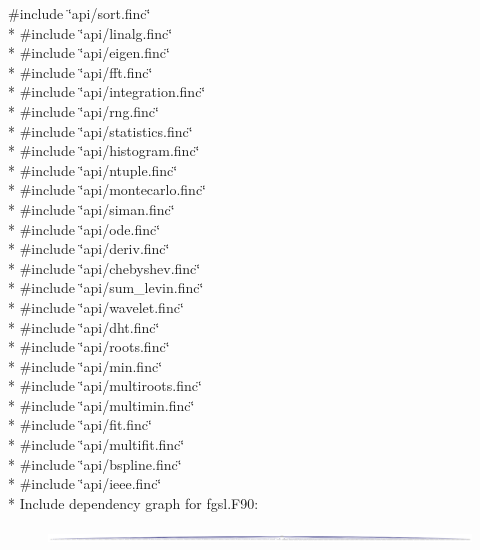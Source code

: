 {\ttfamily \#include \char`\"{}api/sort.\-finc\char`\"{}}\\*
{\ttfamily \#include \char`\"{}api/linalg.\-finc\char`\"{}}\\*
{\ttfamily \#include \char`\"{}api/eigen.\-finc\char`\"{}}\\*
{\ttfamily \#include \char`\"{}api/fft.\-finc\char`\"{}}\\*
{\ttfamily \#include \char`\"{}api/integration.\-finc\char`\"{}}\\*
{\ttfamily \#include \char`\"{}api/rng.\-finc\char`\"{}}\\*
{\ttfamily \#include \char`\"{}api/statistics.\-finc\char`\"{}}\\*
{\ttfamily \#include \char`\"{}api/histogram.\-finc\char`\"{}}\\*
{\ttfamily \#include \char`\"{}api/ntuple.\-finc\char`\"{}}\\*
{\ttfamily \#include \char`\"{}api/montecarlo.\-finc\char`\"{}}\\*
{\ttfamily \#include \char`\"{}api/siman.\-finc\char`\"{}}\\*
{\ttfamily \#include \char`\"{}api/ode.\-finc\char`\"{}}\\*
{\ttfamily \#include \char`\"{}api/deriv.\-finc\char`\"{}}\\*
{\ttfamily \#include \char`\"{}api/chebyshev.\-finc\char`\"{}}\\*
{\ttfamily \#include \char`\"{}api/sum\-\_\-levin.\-finc\char`\"{}}\\*
{\ttfamily \#include \char`\"{}api/wavelet.\-finc\char`\"{}}\\*
{\ttfamily \#include \char`\"{}api/dht.\-finc\char`\"{}}\\*
{\ttfamily \#include \char`\"{}api/roots.\-finc\char`\"{}}\\*
{\ttfamily \#include \char`\"{}api/min.\-finc\char`\"{}}\\*
{\ttfamily \#include \char`\"{}api/multiroots.\-finc\char`\"{}}\\*
{\ttfamily \#include \char`\"{}api/multimin.\-finc\char`\"{}}\\*
{\ttfamily \#include \char`\"{}api/fit.\-finc\char`\"{}}\\*
{\ttfamily \#include \char`\"{}api/multifit.\-finc\char`\"{}}\\*
{\ttfamily \#include \char`\"{}api/bspline.\-finc\char`\"{}}\\*
{\ttfamily \#include \char`\"{}api/ieee.\-finc\char`\"{}}\\*
Include dependency graph for fgsl.\-F90\-:
\nopagebreak
\begin{figure}[H]
\begin{center}
\leavevmode
\includegraphics[width=350pt]{fgsl_8F90__incl}
\end{center}
\end{figure}

